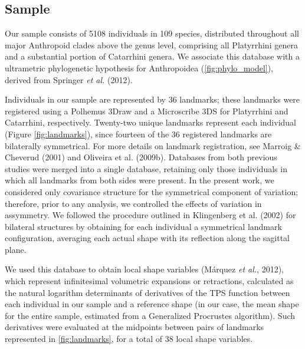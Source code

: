 \documentclass[12pt,twoside]{report}
\begin{document}
\subsection{Sample}\label{sample-2}

Our sample consists of 5108 individuals in 109 species, distributed
throughout all major Anthropoid clades above the genus level, comprising
all Platyrrhini genera and a substantial portion of Catarrhini genera.
We associate this database with a ultrametric phylogenetic hypothesis
for Anthropoidea (\autoref{fig:phylo_model}), derived from Springer
\emph{et al.} (2012).

Individuals in our sample are represented by 36 landmarks; these
landmarks were registered using a Polhemus 3Draw and a Microscribe 3DS
for Platyrrhini and Catarrhini, respectively. Twenty-two unique
landmarks represent each individual (Figure \ref{fig:landmarks}), since
fourteen of the 36 registered landmarks are bilaterally symmetrical. For
more details on landmark registration, see Marroig \& Cheverud (2001)
and Oliveira et al. (2009b). Databases from both previous studies were
merged into a single database, retaining only those individuals in which
all landmarks from both sides were present. In the present work, we
considered only covariance structure for the symmetrical component of
variation; therefore, prior to any analysis, we controlled the effects
of variation in assymmetry. We followed the procedure outlined in
Klingenberg et al. (2002) for bilateral structures by obtaining for each
individual a symmetrical landmark configuration, averaging each actual
shape with its reflection along the sagittal plane.

We used this database to obtain local shape variables (Márquez \emph{et
al.}, 2012), which represent infinitesimal volumetric expansions or
retractions, calculated as the natural logarithm determinants of
derivatives of the TPS function between each individual in our sample
and a reference shape (in our case, the mean shape for the entire
sample, estimated from a Generalized Procrustes algorithm). Such
derivatives were evaluated at the midpoints between pairs of landmarks
represented in \autoref{fig:landmarks}, for a total of 38 local shape
variables.
\end{document}
